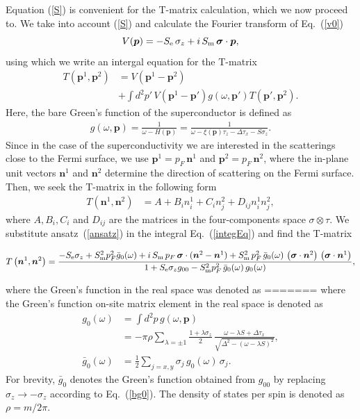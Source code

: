 \documentclass[twocolumn,showpacs,floatfix,nofootinbib,longbibliography]{revtex4-1}
\begin{document}
Equation  (\ref{S}) is convenient for the T-matrix calculation, which we now proceed to. We take into account (\ref{S}) and calculate the Fourier transform of Eq.~(\ref{v0})
\begin{equation}
	V(\bm p) = -S_{\rm e}\,\sigma_z +  i \,S_{\rm m} \, \bm \sigma\cdot \bm  p,
	\label{vp}
\end{equation}
using which we write an intergal equation for the T-matrix
\begin{align}
	T\left(\bm p^{1},\bm p^{2}\right) &= V \left(\bm p^{1}-\bm p^{2}\right) \nonumber \\
	& +\int d^2 p'\, V\left(\bm p^{1}-\bm p'\right) g(\omega,\bm p')  T\left(\bm p',\bm p^{2}\right).
	\label{integEq}
\end{align}
Here, the bare Green's function of the superconductor is defined as
\begin{align}
	g(\omega,\bm p) = \frac{1}{\omega-H(\bm p)} = \frac{1}{\omega-\xi(\bm p)\tau_z-\Delta \tau_x - S\sigma_z}.
\end{align}
Since in the case of the superconductivity we are interested in the scatterings close to the Fermi surface, we use $\bm p^{1} = p_F\, \bm n^{1}$ and $\bm p^{2} = p_F \,\bm n^{2}$, where the in-plane unit vectors $\bm n^{1}$ and $\bm n^{2}$ determine the direction of scattering on the Fermi surface.  Then, we seek the T-matrix in the following form
\begin{align}
	T\left(\bm n^{1},\bm n^{2}\right) &= A + B_i n^{1}_i + C_i n^{2}_j + D_{ij} n^{1}_i n^{2}_j, \label{ansatz}
\end{align}
where  $A,B_i,C_i$ and $D_{ij}$ are the matrices in the four-components space $\sigma\otimes\tau$. We substitute ansatz~(\ref{ansatz}) in the integral Eq.~(\ref{integEq}) and find the T-matrix
\begin{widetext}
\begin{equation}
	T\left(\bm n^{1},\bm n^{2}\right) = \frac{-S_{\rm e}\sigma_z+S^2_{\rm m}p_F^2\bar g_{0}(\omega)+i\,S_{\rm m}\,p_F \,  \bm \sigma\cdot(\bm n^{2}- \bm n^{1}) +S^2_{\rm m}\, p^2_F \, \bar g_{0}(\omega)\,\left(\bm \sigma\cdot\bm n^{2}\right)\,\left(\bm \sigma\cdot \bm n^{1}\right)}{1+S_{\rm e}\sigma_zg_{00}-S^2_{\rm m}p_F^2\,\bar g_{0}(\omega)\, g_{0}(\omega)},
\end{equation}
\end{widetext}
where the Green's function in the real space was denoted as
=======
where the Green's function on-site matrix element in the real space is denoted as
\begin{align}
	g_{0}(\omega) &   =\int d^2 p\, g(\omega,\bm p)  	\label{g0} \\
	 & =-\pi\rho\sum_{\lambda = \pm 1} \frac{1+\lambda\sigma_z}{2}\,\frac{\omega-\lambda S+\Delta\tau_x}{\sqrt{\Delta^2-\left( \omega-\lambda S \right)^2}}, \nonumber \\
	 \bar g_{0}(\omega) & = \frac{1}{2} \sum_{j=x,y}\sigma_j\, g_{0}(\omega)\, \sigma_j.\label{bg0}
\end{align}
For brevity, $\bar g_{0}$ denotes the Green's function obtained from $g_{00}$ by replacing $\sigma_z \rightarrow - \sigma_z$ according to Eq.~(\ref{bg0}). The density of states per spin is denoted as $\rho = m/2\pi$.
\end{document}
